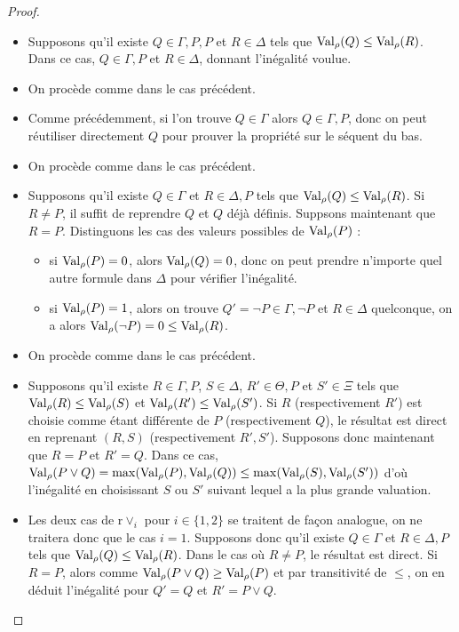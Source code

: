 \begin{proof}
\begin{itemize}
  \item Supposons qu'il existe $Q\in\Gamma,P,P$ et $R\in\Delta$ tels que
    $\operatorname{Val}_\rho(Q)\leq\operatorname{Val}_\rho(R)$. Dans ce cas, $Q\in\Gamma,P$ et $R\in\Delta$,
    donnant l'inégalité voulue.
  \item On procède comme dans le cas précédent.
  \item Comme précédemment, si l'on trouve $Q\in\Gamma$ alors $Q\in\Gamma,P$,
    donc on peut réutiliser directement $Q$ pour prouver la propriété sur le
    séquent du bas.
  \item On procède comme dans le cas précédent.
  \item Supposons qu'il existe $Q\in\Gamma$ et $R\in\Delta,P$ tels que
    $\operatorname{Val}_\rho(Q)\leq\operatorname{Val}_\rho(R)$. Si $R \neq P$, il suffit de reprendre $Q$ et
    $Q$ déjà définis. Suppsons maintenant que $R = P$. Distinguons les cas des
    valeurs possibles de $\operatorname{Val}_\rho(P)$ :
    \begin{itemize}
    \item si $\operatorname{Val}_\rho(P) = 0$, alors $\operatorname{Val}_\rho(Q) = 0$, donc on peut prendre
      n'importe quel autre formule dans $\Delta$ pour vérifier l'inégalité.
    \item si $\operatorname{Val}_\rho(P) = 1$, alors on trouve
      $Q' = \lnot P \in \Gamma,\lnot P$ et $R\in \Delta$ quelconque, on a alors
      $\operatorname{Val}_\rho(\lnot P) = 0 \leq \operatorname{Val}_\rho(R)$.
    \end{itemize}
  \item On procède comme dans le cas précédent.
  \item Supposons qu'il existe $R\in\Gamma,P$, $S\in\Delta$, $R'\in\Theta,P$ et
    $S'\in\Xi$ tels que $\operatorname{Val}_\rho(R)\leq\operatorname{Val}_\rho(S)$ et
    $\operatorname{Val}_\rho(R')\leq\operatorname{Val}_\rho(S')$. Si $R$ (respectivement $R'$) est choisie
    comme étant différente de $P$ (respectivement $Q$), le résultat est direct
    en reprenant $(R,S)$ (respectivement $R',S'$). Supposons donc maintenant que
    $R = P$ et $R' = Q$. Dans ce cas,
    $\operatorname{Val}_\rho(P\lor Q) = \max(\operatorname{Val}_\rho(P),\operatorname{Val}_\rho(Q)) \leq \max(\operatorname{Val}_\rho(S),
    \operatorname{Val}_\rho(S'))$ d'où l'inégalité en choisissant $S$ ou $S'$ suivant lequel
    a la plus grande valuation.
  \item Les deux cas de $\mathrm r\lor_i$ pour $i\in\{1,2\}$ se traitent de
    façon analogue, on ne traitera donc que le cas $i = 1$. Supposons donc qu'il
    existe $Q\in\Gamma$ et $R\in\Delta,P$ tels que
    $\operatorname{Val}_\rho(Q)\leq\operatorname{Val}_\rho(R)$. Dans le cas où $R\neq P$, le résultat est
    direct. Si $R = P$, alors comme $\operatorname{Val}_\rho(P\lor Q) \geq \operatorname{Val}_\rho(P)$ et
    par transitivité de $\leq$, on en déduit l'inégalité pour $Q' = Q$ et
    $R' = P\lor Q$.
  \end{itemize}
\end{proof}

